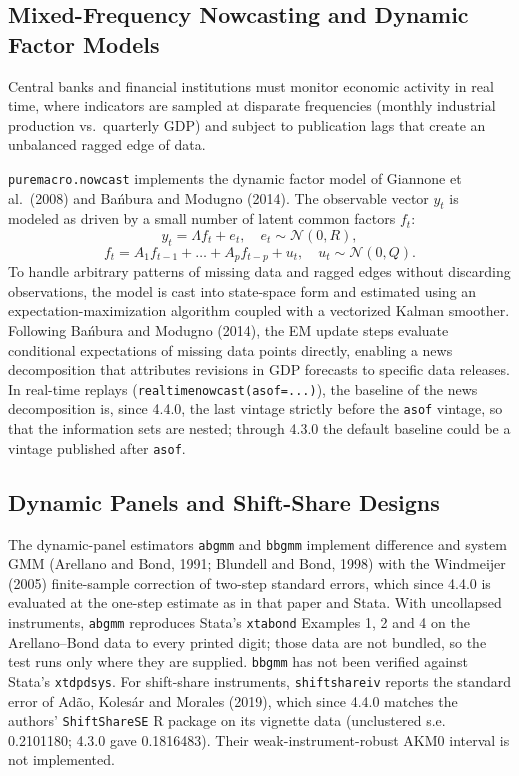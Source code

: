 \documentclass[11pt,letterpaper]{article}
\newcounter{none} %
\renewcommand{\_}{\pmunderscore\allowbreak}
\begin{document}
\subsection{Mixed-Frequency Nowcasting and Dynamic Factor Models}\label{mixed-frequency-nowcasting-and-dynamic-factor-models}

Central banks and financial institutions must monitor economic activity in real time, where indicators are sampled at disparate frequencies (monthly industrial production vs.~quarterly GDP) and subject to publication lags that create an unbalanced ragged edge of data.

\texttt{puremacro.nowcast} implements the dynamic factor model of Giannone et al.~(2008) and Bańbura and Modugno (2014). The observable vector \(y_t\) is modeled as driven by a small number of latent common factors \(f_t\):
\[y_t = \Lambda f_t + e_t, \quad e_t \sim \mathcal{N}(0, R),\]
\[f_t = A_1 f_{t-1} + \dots + A_p f_{t-p} + u_t, \quad u_t \sim \mathcal{N}(0, Q).\]
To handle arbitrary patterns of missing data and ragged edges without discarding observations, the model is cast into state-space form and estimated using an expectation-maximization algorithm coupled with a vectorized Kalman smoother. Following Bańbura and Modugno (2014), the EM update steps evaluate conditional expectations of missing data points directly, enabling a news decomposition that attributes revisions in GDP forecasts to specific data releases. In real-time replays (\texttt{realtime\_nowcast(as\_of=...)}), the baseline of the news decomposition is, since 4.4.0, the last vintage strictly before the \texttt{as\_of} vintage, so that the information sets are nested; through 4.3.0 the default baseline could be a vintage published after \texttt{as\_of}.

\subsection{Dynamic Panels and Shift-Share Designs}\label{dynamic-panels-and-shift-share-designs}

The dynamic-panel estimators \texttt{ab\_gmm} and \texttt{bb\_gmm} implement difference and system GMM (Arellano and Bond, 1991; Blundell and Bond, 1998) with the Windmeijer (2005) finite-sample correction of two-step standard errors, which since 4.4.0 is evaluated at the one-step estimate as in that paper and Stata. With uncollapsed instruments, \texttt{ab\_gmm} reproduces Stata's \texttt{xtabond} Examples 1, 2 and 4 on the Arellano--Bond data to every printed digit; those data are not bundled, so the test runs only where they are supplied. \texttt{bb\_gmm} has not been verified against Stata's \texttt{xtdpdsys}. For shift-share instruments, \texttt{shift\_share\_iv} reports the standard error of Adão, Kolesár and Morales (2019), which since 4.4.0 matches the authors' \texttt{ShiftShareSE} R package on its vignette data (unclustered s.e. 0.2101180; 4.3.0 gave 0.1816483). Their weak-instrument-robust AKM0 interval is not implemented.
\end{document}
